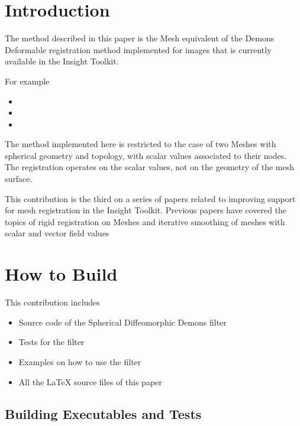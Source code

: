 \documentclass{InsightArticle}
\begin{document}
\tableofcontents

\section{Introduction}

The method described in this paper is the Mesh equivalent of the Demons
Deformable registration method implemented for images that is currently
available in the Insight Toolkit.

For example

\begin{itemize}
\item {}
\item {}
\item {}
\end{itemize}

The method implemented here is restricted to the case of two Meshes with
spherical geometry and topology, with scalar values associated to their nodes.
The registration operates on the scalar values, not on the geometry of the mesh
surface.

This contribution is the third on a series of papers related to improving
support for mesh registration in the Insight Toolkit. Previous papers have
covered the topics of rigid registration on Meshes and iterative smoothing of
meshes with scalar and vector field
values~\cite{MeshSmoothingIJ2009,MeshRigidRegistrationIJ2009} 

\section{How to Build}

This contribution includes

\begin{itemize}
\item Source code of the Spherical Diffeomorphic Demons filter
\item Tests for the filter
\item Examples on how to use the filter
\item All the LaTeX source files of this paper
\end{itemize}

\subsection{Building Executables and Tests}
\end{document}
